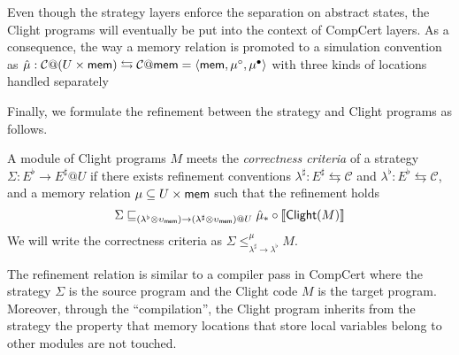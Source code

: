 \documentclass[acmsmall,review,anonymous]{acmart}\settopmatter{printfolios=true,printccs=false,printacmref=false}
\begin{document}
Even though the strategy layers
enforce the separation on abstract states,
the Clight programs will eventually be
put into the context of CompCert layers.
As a consequence,
the way a memory relation is promoted
to a simulation convention
as
$\hat{\mu}: \mathcal{C}@(U\times \mathsf{mem} )\leftrightarrows \mathcal{C}@ \mathsf{mem} 
= \langle  \mathsf{mem} , \mu^\circ, \mu^\bullet \rangle$
with three kinds of locations
handled separately

Finally, we formulate
the refinement between the strategy and Clight programs
as follows.

\begin{definition}
  A module of Clight programs $M$ meets
  the \emph{correctness criteria} of a strategy
  $\Sigma: E^\flat \rightarrow E^\sharp @ U$
  if there exists
  refinement conventions
  $\lambda^\sharp: E^\sharp \leftrightarrows \mathcal{C}$
  and $\lambda^\flat: E^\flat \leftrightarrows \mathcal{C}$,
  and a memory relation $\mu \subseteq U \times  \mathsf{mem} $
  such that the refinement holds
  \[
    \Sigma \sqsubseteq_{(\lambda^\flat \otimes \upsilon_{ \mathsf{mem} })
      \rightarrow (\lambda^\sharp \otimes \upsilon_{ \mathsf{mem} })@U}
    \hat{\mu}_* \circ \llbracket  \mathsf{Clight} (M) \rrbracket
  \]
  We will write the correctness criteria
  as $\Sigma \le^\mu_{\lambda^\sharp \rightarrow \lambda^\flat} M$.
\end{definition}

The refinement relation
is similar to a compiler pass in CompCert
where the strategy $\Sigma$ is the source program
and the Clight code $M$ is the target program.
Moreover, through the ``compilation'',
the Clight program inherits
from the strategy the property
that memory locations that store local variables
belong to other modules are not touched.
\end{document}
